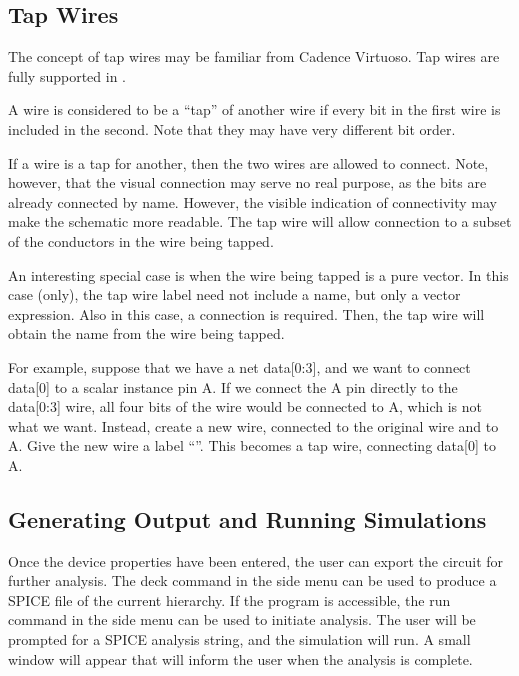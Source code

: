 \subsection{Tap Wires}

The concept of tap wires may be familiar from Cadence Virtuoso. 
Tap wires are fully supported in {\Xic}.

A wire is considered to be a ``tap'' of another wire if every bit in
the first wire is included in the second.  Note that they may have
very different bit order.

If a wire is a tap for another, then the two wires are allowed to
connect.  Note, however, that the visual connection may serve no real
purpose, as the bits are already connected by name.  However, the
visible indication of connectivity may make the schematic more
readable.  The tap wire will allow connection to a subset of the
conductors in the wire being tapped.

An interesting special case is when the wire being tapped is a pure
vector.  In this case (only), the tap wire label need not include a
name, but only a vector expression.  Also in this case, a connection
is required.  Then, the tap wire will obtain the name from the wire
being tapped.

For example, suppose that we have a net {\vt data[0:3]}, and we want
to connect {\vt data[0]} to a scalar instance pin {\vt A}.  If we
connect the {\vt A} pin directly to the {\vt data[0:3]} wire, all four
bits of the wire would be connected to {\vt A}, which is not what we
want.  Instead, create a new wire, connected to the original wire and
to {\vt A}.  Give the new wire a label ``{\vt [0]}''.  This becomes a
tap wire, connecting {\vt data[0]} to {\vt A}.

\subsection{Generating Output and Running Simulations}

Once the device properties have been entered, the user can export the
circuit for further analysis.  The {\cb deck} command in the side menu
can be used to produce a SPICE file of the current hierarchy.  If the
{\WRspice} program is accessible, the {\cb run} command in the side
menu can be used to initiate analysis.  The user will be prompted for
a SPICE analysis string, and the simulation will run.  A small window
will appear that will inform the user when the analysis is complete.

